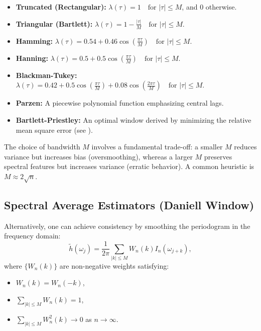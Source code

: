 \documentclass[twoside]{article}
\begin{document}
\begin{itemize}
    \item \textbf{Truncated (Rectangular):} $\lambda(\tau) = 1 \quad \text{for } |\tau| \le M$, and $0$ otherwise.
    \item \textbf{Triangular (Bartlett):} $\lambda(\tau) = 1 - \frac{|\tau|}{M} \quad \text{for } |\tau| \le M$.
    \item \textbf{Hamming:} $\lambda(\tau) = 0.54 + 0.46\cos\left(\frac{\pi \tau}{M}\right) \quad \text{for } |\tau| \le M$.
    \item \textbf{Hanning:} $\lambda(\tau) = 0.5 + 0.5\cos\left(\frac{\pi \tau}{M}\right) \quad \text{for } |\tau| \le M$.
    \item \textbf{Blackman-Tukey:} $\lambda(\tau) = 0.42 + 0.5\cos\left(\frac{\pi \tau}{M}\right) + 0.08\cos\left(\frac{2\pi \tau}{M}\right) \quad \text{for } |\tau| \le M$.
    \item \textbf{Parzen:} A piecewise polynomial function emphasizing central lags.
    \item \textbf{Bartlett-Priestley:} An optimal window derived by minimizing the relative mean square error (see \cite{Priestley:1962}).
\end{itemize}



The choice of bandwidth $M$ involves a fundamental trade-off: a smaller $M$ reduces variance but increases bias (oversmoothing), whereas a larger $M$ preserves spectral features but increases variance (erratic behavior). A common heuristic is $M \approx 2\sqrt{n}$.



\subsection{Spectral Average Estimators (Daniell Window)}



Alternatively, one can achieve consistency by smoothing the periodogram in the frequency domain:
\begin{equation}
\tilde{h}(\omega_j) = \frac{1}{2\pi} \sum_{|k| \le M} W_n(k) I_n(\omega_{j+k}),
\end{equation}
where $\{W_n(k)\}$ are non-negative weights satisfying:
\begin{itemize}
    \item $W_n(k) = W_n(-k)$,
    \item $\sum_{|k| \le M} W_n(k) = 1$,
    \item $\sum_{|k| \le M} W_n^2(k) \to 0$ as $n \to \infty$.
\end{itemize}
\end{document}
